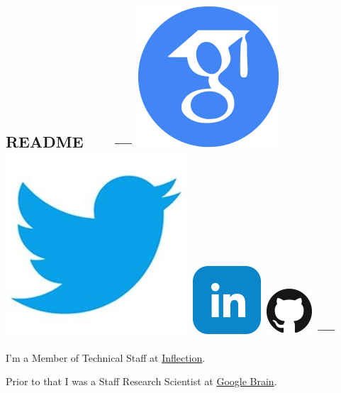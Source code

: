 \documentclass{article}
\begin{document}
\subsection*{README \ \ \ --- \protect
\href{https://scholar.google.com/citations?user=IMkVH_8AAAAJ&hl=en}{\includegraphics[natwidth=22, natheight=22]{img/google-scholar.png}}
\href{https://twitter.com/Hanxiao_6}{\includegraphics[natwidth=22, natheight=22]{img/twitter.jpg}}
\href{https://www.linkedin.com/in/hanxiao-liu-17194a4a/}{\includegraphics[natwidth=22, natheight=22]{img/linkedin.png}}
\href{https://github.com/quark0}{\includegraphics[natwidth=22, natheight=22]{img/GitHub-Mark-64px.png}}
---
}
\noindent I'm a Member of Technical Staff at \href{https://inflection.ai}{Inflection}.

\noindent Prior to that I was a Staff Research Scientist at \href{https://ai.google/research/teams/brain}{Google Brain}.
\end{document}
